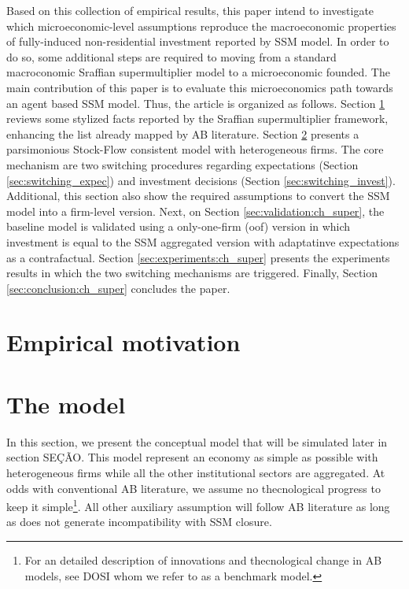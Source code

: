 \documentclass{SelfArx}
\begin{document}
Based on this collection of empirical results, this paper intend to investigate which microeconomic-level assumptions reproduce the macroeconomic properties of fully-induced non-residential investment reported by SSM model.
In order to do so, some additional steps are required to moving from a standard macroconomic Sraffian supermultiplier model to a microeconomic founded.
The main contribution of this paper is to evaluate this microeconomics path towards an agent based SSM model.
Thus, the article is organized as follows.
Section \ref{sec:empirical:ch_super} reviews some stylized facts reported by the Sraffian supermultiplier framework, enhancing the list already mapped by AB literature.
Section \ref{sec:model:ch_super} presents a parsimonious Stock-Flow consistent model with heterogeneous firms.
The core mechanism are two switching procedures regarding expectations (Section \ref{sec:switching_expec}) and investment decisions (Section \ref{sec:switching_invest}).
Additional, this section also show the required assumptions to convert the SSM model into a firm-level version.
Next, on Section \ref{sec:validation:ch_super}, the baseline model is validated using a only-one-firm (oof) version in which investment is equal to the SSM aggregated version with adaptatinve expectations as a contrafactual.
Section \ref{sec:experiments:ch_super} presents the experiments results in which the two switching mechanisms are triggered.
Finally, Section \ref{sec:conclusion:ch_super} concludes the paper.


\section{Empirical motivation}
\label{sec:empirical:ch_super}
\section{The model}
\label{sec:model:ch_super}
In this section, we present the conceptual model that will be simulated later in section SEÇÃO.
This model represent an economy as simple as possible with heterogeneous firms while all the other institutional sectors are aggregated.
At odds with conventional AB literature, we assume no thecnological progress to keep it simple\footnote{For an detailed description of innovations and thecnological change in AB models, see DOSI whom we refer to as a benchmark model.}.
All other auxiliary assumption will follow AB literature as long as does not generate incompatibility with SSM closure.
\end{document}
